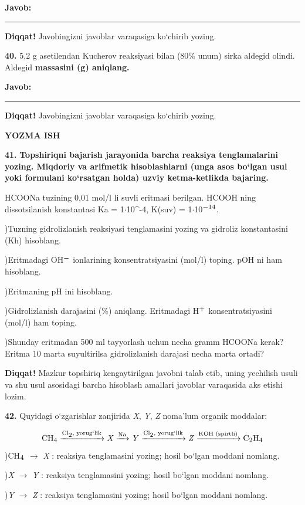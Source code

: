 \documentclass[11pt,a4paper]{article}
\renewcommand{\textsubscript}[1]{\ensuremath{_{\text{\fontsize{8}{8}\selectfont #1}}}}
\renewcommand{\textsuperscript}[1]{\ensuremath{^{\text{\fontsize{8}{8}\selectfont #1}}}}
\newcommand{\diqqat}[1]{\par\smallskip\noindent\textbf{Diqqat!} #1\par\medskip}
\newcommand{\javob}{\par\smallskip\noindent\textbf{Javob:} \rule[-2pt]{7.5cm}{0.4pt}\par\smallskip\noindent\textbf{Diqqat!} Javobingizni javoblar varaqasiga ko`chirib yozing.\par\medskip}
\begin{document}
\javob
\noindent\textbf{40.} 5,2 g asetilendan Kucherov reaksiyasi bilan (80\% unum) sirka aldegid olindi. Aldegid \textbf{massasini (g) aniqlang.}
\javob
\par\bigskip\begin{center}\textbf{\fontsize{13}{15}\selectfont YOZMA ISH}\end{center}
\noindent\textbf{41.} \textbf{Topshiriqni bajarish jarayonida barcha reaksiya tenglamalarini yozing. Miqdoriy va arifmetik hisoblashlarni (unga asos bo`lgan usul yoki formulani ko`rsatgan holda) uzviy ketma-ketlikda bajaring.}\par\smallskip
HCOONa tuzining 0,01 mol/l li suvli eritmasi berilgan. HCOOH ning dissotsilanish konstantasi Ka = 1$\cdot$10\textasciicircum{}-4, K(suv) = 1$\cdot$10\textsuperscript{$-$14}.\par
{})Tuzning gidrolizlanish reaksiyasi tenglamasini yozing va gidroliz konstantasini (Kh) hisoblang.\par
{})Eritmadagi OH\textsuperscript{$-$} ionlarining konsentratsiyasini (mol/l) toping. pOH ni ham hisoblang.\par
{})Eritmaning pH ini hisoblang.\par
{})Gidrolizlanish darajasini (\%) aniqlang. Eritmadagi H\textsuperscript{+} konsentratsiyasini (mol/l) ham toping.\par
{})Shunday eritmadan 500 ml tayyorlash uchun necha gramm HCOONa kerak? Eritma 10 marta suyultirilsa gidrolizlanish darajasi necha marta ortadi?\par
\diqqat{Mazkur topshiriq kengaytirilgan javobni talab etib, uning yechilish usuli va shu usul asosidagi barcha hisoblash amallari javoblar varaqasida aks etishi lozim.}
\noindent\textbf{42.} Quyidagi o`zgarishlar zanjirida \textit{X}, \textit{Y}, \textit{Z} noma'lum organik moddalar:\par
\[\setlength{\fboxsep}{0pt}\text{CH\textsubscript{4}}\xrightarrow{\text{Cl\textsubscript{2}, yorug`lik}}\text{\textit{X}}\xrightarrow{\text{Na}}\text{\textit{Y}}\xrightarrow{\text{Cl\textsubscript{2}, yorug`lik}}\text{\textit{Z}}\xrightarrow{\text{KOH (spirtli)}}\text{C\textsubscript{2}H\textsubscript{4}}\]
)CH\textsubscript{4} $\to$ \textit{X} : reaksiya tenglamasini yozing; hosil bo`lgan moddani nomlang.\par
{})\textit{X} $\to$ \textit{Y} : reaksiya tenglamasini yozing; hosil bo`lgan moddani nomlang.\par
{})\textit{Y} $\to$ \textit{Z} : reaksiya tenglamasini yozing; hosil bo`lgan moddani nomlang.\par
\end{document}
